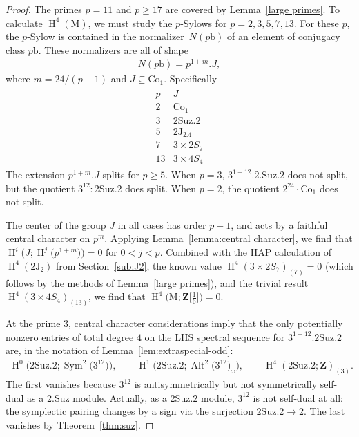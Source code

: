 \documentclass[pdftex]{sigma}
\numberwithin{equation}{section}
\newcommand\bZ{\mathbf Z}
\newcommand\rb{\mathrm b}
\newcommand\rJ{\mathrm J}
\newcommand\rM{\mathrm M}
\DeclareMathOperator\homology{H}
\renewcommand\H{\homology}
\newcommand\<\langle
\renewcommand\>\rangle
\newcommand\Co{\mathrm{Co}}
\newcommand\Suz{\mathrm{Suz}}
\DeclareMathOperator\Sym{Sym}
\DeclareMathOperator\Alt{Alt}
\begin{document}
\begin{proof}
 The primes $p=11$ and $p\geq 17$ are covered by Lemma~\ref{large primes}. To calculate $\H^4(\rM)$, we must study the $p$-Sylows for $p=2,3,5,7,13$. For these $p$, the $p$-Sylow is contained in the normalizer~$N(p\rb)$ of an element of conjugacy class $p\rb$. These normalizers are all of shape
 \begin{gather*} N(p\rb) = p^{1 + m}.J , \end{gather*}
 where $m = 24/(p-1)$ and $J \subseteq \Co_1$. Specifically
 \begin{gather*} \begin{array}{c|c}
 p & J \\ \hline
 2 & \Co_1 \\
 3 & 2\Suz.2 \\
 5 & 2\rJ_2.4 \\
 7 & 3 \times 2S_7 \\
 13 & 3 \times 4S_4 \end{array} \end{gather*}
 The extension $p^{1 + m}.J$ splits for $p\geq 5$. When $p=3$, $3^{1+12}.2.\Suz.2$ does not split, but the quotient $3^{12}:2\Suz.2$ does split. When $p=2$, the quotient $2^{24}\cdot \Co_1$ does not split.

 The center of the group $J$ in all cases has order $p-1$, and acts by a faithful central character on $p^m$. Applying Lemma~\ref{lemma:central character},
 we find that $\H^i\big(J; \H^j\big(p^{1+m}\big)\big) = 0$ for $0 < j < p$. Combined with the HAP calculation of $\H^4(2\rJ_2)$ from Section~\ref{sub:J2}, the known value $\H^4(3\times 2S_7)_{(7)} = 0$ (which follows by the methods of Lemma~\ref{large primes}), and the trivial result $\H^4(3 \times 4S_4)_{(13)}$, we find that $\H^4\big(\rM; \bZ\big[\frac16\big]\big) = 0$.

 At the prime $3$, central character considerations imply that the only potentially nonzero entries of total degree $4$ on the LHS spectral sequence for $3^{1+12}.2\Suz.2$ are, in the notation of Lemma~\ref{lem:extraspecial-odd}:
 \begin{gather*} \H^0\big(2\Suz.2; \Sym^2\big(3^{12}\big)\big), \qquad \H^1\big(2\Suz.2; \Alt^2\big(3^{12}\big)_\omega\big), \qquad \H^4(2\Suz.2; \bZ)_{(3)}. \end{gather*}
 The first vanishes because $3^{12}$ is antisymmetrically but not symmetrically self-dual as a $2.\Suz$ module. Actually, as a $2\Suz.2$ module, $3^{12}$ is not self-dual at all: the symplectic pairing changes by a sign via the surjection $2\Suz.2 \to 2$. The last vanishes by Theorem~\ref{thm:suz}.


\end{proof}
\end{document}
